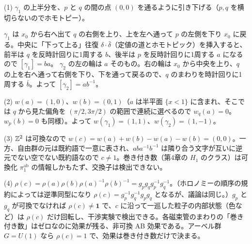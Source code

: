 \begin{solution}
(1) $\gamma_1$ の上半分を、$p$ と $q$ の間の点 $(0,0)$ を通るように引き下げる（$p,q$ を横切らないのでホモトピー）。
\begin{center}
\end{center}
$\gamma_1$ は $x_0$ から右へ出て $q$ の右側を上り、上を左へ通って $p$ の左側を下り $x_0$ に戻る。中央に「下って上る」往復 $\delta\cdot\bar\delta$（定値の道とホモトピック）を挿入すると、前半は $q$ を反時計回りに1周する $b$、後半は $p$ を反時計回りに1周する $a$ になるので $[\gamma_1]=ba$。
$\gamma_2$ の左の輪は $a$ そのもの。右の輪は $x_0$ から中央を上り、$q$ の上を右へ通って右側を下り、下を通って戻るので、$q$ のまわりを時計回りに1周する $\bar b$。よって $[\gamma_2]=ab^{-1}$。

(2) $w(a)=(1,0)$、$w(b)=(0,1)$（$a$ は半平面 $\{x<1\}$ に含まれ、そこでは $q$ から見た偏角を $(\pi/2,3\pi/2)$ の範囲で連続に選べるので $w_q(a)=0$。$w_p(b)=0$ も同様）。よって $w(\gamma_1)=(1,1)$、$w(\gamma_2)=(1,-1)$。

(3) $\mathbb{Z}^2$ は可換なので $w(c)=w(a)+w(b)-w(a)-w(b)=(0,0)$。一方、自由群の元は既約語で一意に表され、$aba^{-1}b^{-1}$ は隣り合う文字が互いに逆元でない空でない既約語なので $c\neq1$。巻き付き数（第4章の $H_1$ のクラス）は可換化 $\pi_1^{\mathrm{ab}}$ の情報しかもたず、交換子は検出できない。

(4) $\rho(c)=\rho(a)\rho(b)\rho(a)^{-1}\rho(b)^{-1}=g_pg_qg_p^{-1}g_q^{-1}$。（ホロノミーの順序の規約によっては逆準同型になり $\rho(c)=g_p^{-1}g_q^{-1}g_pg_q$ となるが、議論は同じ。）$g_p$ と $g_q$ が可換でなければ $\rho(c)\ne\mathbf 1$ で、$c$ に沿って一巡した粒子の内部状態（色など）は $\rho(c)$ だけ回転し、干渉実験で検出できる。各磁束管のまわりの「巻き付き数」はゼロなのに効果が残る、非可換 AB 効果である。アーベル群 $G=U(1)$ なら $\rho(c)=1$ で、効果は巻き付き数だけで決まる。
\end{solution}

